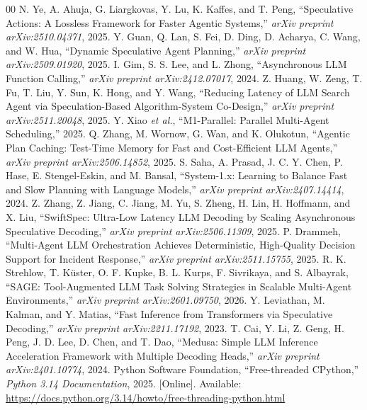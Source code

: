 \documentclass[conference]{IEEEtran}
\begin{document}
\begin{thebibliography}{00}
 N. Ye, A. Ahuja, G. Liargkovas, Y. Lu, K. Kaffes,
  and T. Peng, ``Speculative Actions: A Lossless Framework for Faster Agentic
  Systems,'' \textit{arXiv preprint arXiv:2510.04371}, 2025.
 Y. Guan, Q. Lan, S. Fei, D. Ding, D. Acharya, C. Wang,
  and W. Hua, ``Dynamic Speculative Agent Planning,''
  \textit{arXiv preprint arXiv:2509.01920}, 2025.
 I. Gim, S. S. Lee, and L. Zhong, ``Asynchronous LLM
  Function Calling,'' \textit{arXiv preprint arXiv:2412.07017}, 2024.
 Z. Huang, W. Zeng, T. Fu, T. Liu, Y. Sun, K. Hong,
  and Y. Wang, ``Reducing Latency of LLM Search Agent via Speculation-Based
  Algorithm-System Co-Design,''
  \textit{arXiv preprint arXiv:2511.20048}, 2025.
 Y. Xiao \textit{et al.},
  ``M1-Parallel: Parallel Multi-Agent Scheduling,'' 2025.
 Q. Zhang, M. Wornow, G. Wan, and K. Olukotun,
  ``Agentic Plan Caching: Test-Time Memory for Fast and Cost-Efficient LLM
  Agents,'' \textit{arXiv preprint arXiv:2506.14852}, 2025.
 S. Saha, A. Prasad, J. C. Y. Chen, P. Hase,
  E. Stengel-Eskin, and M. Bansal, ``System-1.x: Learning to Balance Fast
  and Slow Planning with Language Models,''
  \textit{arXiv preprint arXiv:2407.14414}, 2024.
 Z. Zhang, Z. Jiang, C. Jiang, M. Yu, S. Zheng,
  H. Lin, H. Hoffmann, and X. Liu,
  ``SwiftSpec: Ultra-Low Latency LLM Decoding by Scaling Asynchronous
  Speculative Decoding,''
  \textit{arXiv preprint arXiv:2506.11309}, 2025.
 P. Drammeh,
  ``Multi-Agent LLM Orchestration Achieves Deterministic, High-Quality
  Decision Support for Incident Response,''
  \textit{arXiv preprint arXiv:2511.15755}, 2025.
 R. K. Strehlow, T. K\"{u}ster, O. F. Kupke,
  B. L. Kurps, F. Sivrikaya, and S. Albayrak,
  ``SAGE: Tool-Augmented LLM Task Solving Strategies in Scalable
  Multi-Agent Environments,''
  \textit{arXiv preprint arXiv:2601.09750}, 2026.
 Y. Leviathan, M. Kalman, and Y. Matias,
  ``Fast Inference from Transformers via Speculative Decoding,''
  \textit{arXiv preprint arXiv:2211.17192}, 2023.
 T. Cai, Y. Li, Z. Geng, H. Peng, J. D. Lee, D. Chen,
  and T. Dao, ``Medusa: Simple LLM Inference Acceleration Framework with
  Multiple Decoding Heads,''
  \textit{arXiv preprint arXiv:2401.10774}, 2024.
 Python Software Foundation,
  ``Free-threaded CPython,'' \textit{Python 3.14 Documentation}, 2025.
  [Online]. Available:
  \url{https://docs.python.org/3.14/howto/free-threading-python.html}
\end{thebibliography}

\vspace{12pt}
\end{document}
